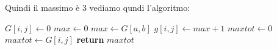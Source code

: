 \documentclass[a4paper,12pt, oneside]{book}
\begin{document}
Quindi il massimo è 3
\newpage
vediamo qundi l'algoritmo:
\begin{algorithm}
  \begin{algorithmic}
    \State $G[i,j]\gets 0$
    \Else
    \State $max\gets 0$
    \State $max \gets G[a,b]$
    \EndIf
    \EndFor
    \EndFor
    \State $g[i,j] \gets max +1$
    \EndIf
    \EndFor
    \EndFor
    \State $maxtot \gets 0$
    \State $maxtot \gets G[i,j]$
    \EndIf
    \EndFor
    \EndFor
    \State \textbf{return} $maxtot$
    \EndFunction
  \end{algorithmic}
\end{algorithm}
\newpage
\end{document}
